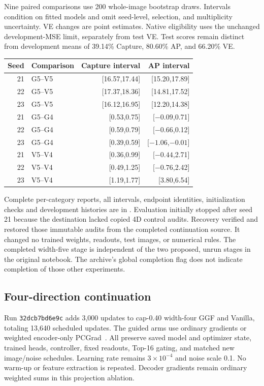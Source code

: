 Nine paired comparisons use 200 whole-image bootstrap draws. Intervals
condition on fitted models and omit seed-level, selection, and multiplicity
uncertainty. VE changes are point estimates. Native eligibility uses the
unchanged development-MSE limit, separately from test VE. Test scores remain
distinct from development means of 39.14\% Capture, 80.60\% AP, and 66.20\% VE.

\begin{agfresulttable}
\caption{All 5D-study paired 95\% image intervals (percentage points).
G5/G4 denote guided models. V5/V4 denote Vanilla.}
\label{tab:width5-intervals}
\begin{tabular}{@{}rlrr@{}}\hline
Seed & Comparison & Capture interval & AP interval\\\hline
21 & G5--V5 & [16.57,17.44] & [15.20,17.89]\\
22 & G5--V5 & [17.37,18.36] & [14.81,17.52]\\
23 & G5--V5 & [16.12,16.95] & [12.20,14.38]\\
21 & G5--G4 & [0.53,0.75] & [$-0.09$,0.71]\\
22 & G5--G4 & [0.59,0.79] & [$-0.66$,0.12]\\
23 & G5--G4 & [0.39,0.59] & [$-1.06$,$-0.01$]\\
21 & V5--V4 & [0.36,0.99] & [$-0.44$,2.71]\\
22 & V5--V4 & [0.49,1.25] & [$-0.76$,2.42]\\
23 & V5--V4 & [1.19,1.77] & [3.80,6.54]\\\hline
\end{tabular}\end{agfresulttable}

Complete per-category reports, all intervals, endpoint identities,
initialization checks and development histories are in
. Evaluation initially stopped after seed 21 because
the destination lacked copied 4D control audits. Recovery verified and
restored those immutable audits from the completed continuation source.
It changed no trained weights, readouts, test images, or numerical rules.
The completed width-five stage is independent of the two proposed, unrun stages
in the original notebook. The archive's global completion flag does not
indicate completion of those other experiments.

\subsection{Four-direction continuation}\label{app:continuation}
Run \texttt{32dcb7bd6e9c} adds 3,000 updates to cap-0.40 width-four
GGF and Vanilla, totaling 13,640 scheduled updates. The guided arms use
ordinary gradients or weighted encoder-only PCGrad~\citep{yu2020pcgrad}.
All preserve saved model and optimizer state, trained heads, controller,
fixed readouts, Top-16 gating, and matched new image/noise schedules.
Learning rate remains $3\times10^{-4}$ and noise scale 0.1. No warm-up or feature
extraction is repeated. Decoder gradients remain ordinary
weighted sums in this projection ablation.

